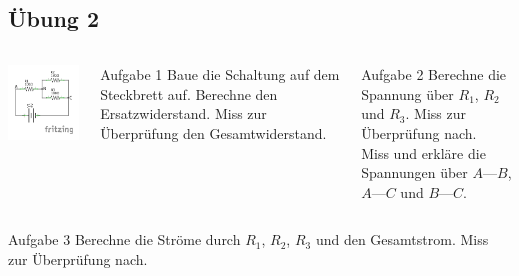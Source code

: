 \subsection*{Übung 2}
\begin{frame}
  \begin{columns}
    \begin{center}
      \includegraphics[width=1\textwidth]{e04/Uebung2_Schaltplan.pdf}
    \end{center}
    \begin{alertblock}{Aufgabe 1}
      Baue die Schaltung auf dem Steckbrett auf.
      Berechne den Ersatzwiderstand. Miss zur Überprüfung den Gesamtwiderstand.
    \end{alertblock}
    \begin{alertblock}{Aufgabe 2}
      Berechne die Spannung über $R_1$, $R_2$ und $R_3$. Miss zur Überprüfung nach.\\
      Miss und erkläre die Spannungen über $A$---$B$, $A$---$C$ und $B$---$C$.
    \end{alertblock}
  \end{columns}
  \begin{alertblock}{Aufgabe 3}
    Berechne die Ströme durch $R_1$, $R_2$, $R_3$ und den Gesamtstrom. Miss zur Überprüfung nach.
  \end{alertblock}
\end{frame}

